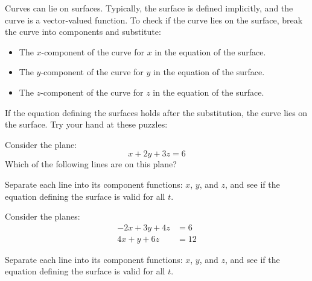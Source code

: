 \documentclass{ximera}
\begin{document}
Curves can lie on surfaces. Typically, the surface is defined
implicitly, and the curve is a vector-valued function. To check if the
curve lies on the surface, break the curve into components and
substitute:
\begin{itemize}
  \item The $x$-component of the curve for $x$ in the equation of the
    surface.
  \item The $y$-component of the curve for $y$ in the equation of
    the surface.
  \item The $z$-component of the curve for $z$ in the equation of the
    surface.
\end{itemize}
If the equation defining the surfaces holds after the substitution, the
curve lies on the surface. Try your hand at these puzzles:

\begin{question}
  Consider the plane:
  \[
  x+2y+3z = 6
  \]
  Which of the following lines are on this plane?
  \begin{selectAll}
  \end{selectAll}
  \begin{hint}
    Separate each line into its component functions: $x$, $y$, and
    $z$, and see if the equation defining the surface is valid for all
    $t$.
  \end{hint}
\end{question}

\begin{question}
  Consider the planes:
  \begin{align*}
    -2x+3y+4z &=6\\
    4x+y+6z &=12
  \end{align*}
  \begin{selectAll}

  \end{selectAll}
  \begin{hint}
    Separate each line into its component functions: $x$, $y$, and
    $z$, and see if the equation defining the surface is valid for all
    $t$.
  \end{hint}
\end{question}
\end{document}
